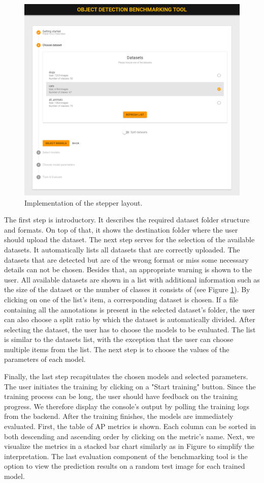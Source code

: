 \begin{figure}[h]
    \centering
    \includegraphics[width=0.85\linewidth]{Sources/Figures/datasets_selection.png}
    \caption{Implementation of the stepper layout.}
    \label{fig:datasets_selection}
\end{figure}

The first step is introductory. It describes the required dataset folder
structure and formats. On top of that, it shows the destination folder where the
user should upload the dataset. The next step serves for the selection of the
available datasets. It automatically lists all datasets that are correctly
uploaded. The datasets that are detected but are of the wrong format or miss
some necessary details can not be chosen. Besides that, an appropriate warning
is shown to the user. All available datasets are shown in a list with additional
information such as the size of the dataset or the number of classes it consists
of (see Figure \ref{fig:datasets_selection}). By clicking on one of the list's
item, a corresponding dataset is chosen. If a file containing all the
annotations is present in the selected dataset's folder, the user can also
choose a split ratio by which the dataset is automatically divided. After
selecting the dataset, the user has to choose the models to be evaluated. The
list is similar to the datasets list, with the exception that the user can
choose multiple items from the list. The next step is to choose the values of
the parameters of each model.

Finally, the last step recapitulates the chosen models and selected parameters.
The user initiates the training by clicking on a "Start training" button. Since
the training process can be long, the user should have feedback on the training
progress. We therefore display the console's output by polling the training logs
from the backend. After the training finishes, the models are immediately
evaluated. First, the table of AP metrics is shown. Each column can be sorted in
both descending and ascending order by clicking on the metric's name. Next, we
visualize the metrics in a stacked bar chart similarly as in Figure
 to simplify the interpretation. The last evaluation component of
the benchmarking tool is the option to view the prediction results on a random
test image for each trained model.


